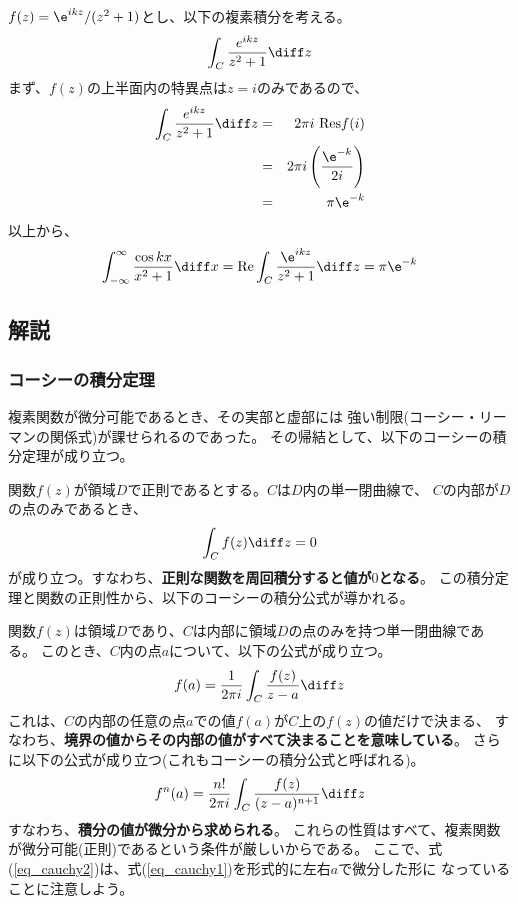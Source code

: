 $f(z) = \e^{ikz}/(z^2+1)$とし、以下の複素積分を考える。
\begin{equation}
  \int_C \frac{e^{ikz}}{z^2+1} \diff z
\end{equation}
まず、$f(z)$の上半面内の特異点は$z=i$のみであるので、
\begin{eqnarray}
  \int_C \frac{e^{ikz}}{z^2+1} \diff z &=& 2\pi i ~\mbox{Res} f(i)\\
  &=& 2\pi i \left( \frac{\e^{-k}}{2i} \right) \\
  &=& \pi \e^{-k}
\end{eqnarray}
以上から、
\begin{equation}
  \int_{-\infty}^{\infty} \frac{\cos kx}{x^2+1} \diff x =
  \mbox{Re} \int_C \frac{\e^{ikz}}{z^2+1} \diff z = \pi \e^{-k}
\end{equation}

\subsection{解説}

\subsubsection{コーシーの積分定理}

複素関数が微分可能であるとき、その実部と虚部には
強い制限(コーシー・リーマンの関係式)が課せられるのであった。
その帰結として、以下のコーシーの積分定理が成り立つ。

関数$f(z)$が領域$D$で正則であるとする。$C$は$D$内の単一閉曲線で、
$C$の内部が$D$の点のみであるとき、
\begin{equation}
  \int_C f(z) \diff z = 0
\end{equation}
が成り立つ。すなわち、{\bf 正則な関数を周回積分すると値が$0$となる}。
この積分定理と関数の正則性から、以下のコーシーの積分公式が導かれる。

関数$f(z)$は領域$D$であり、$C$は内部に領域$D$の点のみを持つ単一閉曲線である。
このとき、$C$内の点$a$について、以下の公式が成り立つ。
\begin{equation}
  f(a) = \frac{1}{2\pi i} \int_C \frac{f(z)}{z-a} \diff z \label{eq_cauchy1}
\end{equation}
これは、$C$の内部の任意の点$a$での値$f(a)$が$C$上の$f(z)$の値だけで決まる、
すなわち、{\bf 境界の値からその内部の値がすべて決まることを意味している}。
さらに以下の公式が成り立つ(これもコーシーの積分公式と呼ばれる)。
\begin{equation}
  f^{n}(a) = \frac{n!}{2\pi i} \int_C \frac{f(z)}{(z-a)^{n+1}} \diff z  \label{eq_cauchy2}
\end{equation}
すなわち、{\bf 積分の値が微分から求められる}。
これらの性質はすべて、複素関数が微分可能(正則)であるという条件が厳しいからである。
ここで、式(\ref{eq_cauchy2})は、式(\ref{eq_cauchy1})を形式的に左右$a$で微分した形に
なっていることに注意しよう。

